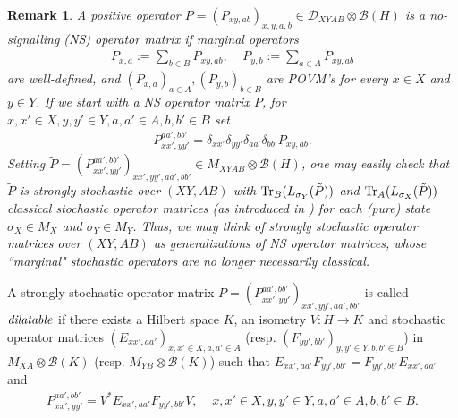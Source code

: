 \documentclass[11pt]{amsart}
\newtheorem{remark}[theorem]{Remark}
\newcommand{\cl}[1]{\mathcal{#1}}
\begin{document}
\begin{remark}\label{ns_generalization}
\rm A positive operator $P = (P_{xy, ab})_{x, y, a, b} \in \cl{D}_{XYAB}\otimes \cl{B}(H)$ is a \textit{no-signalling (NS) operator matrix} \cite{gt_one} if marginal operators
\begin{gather*}
	P_{x, a} := \sum\limits_{b \in B}P_{xy, ab}, \;\;\;\; P_{y, b} := \sum\limits_{a \in A}P_{xy, ab}
\end{gather*}
\noindent are well-defined, and $(P_{x, a})_{a \in A}, (P_{y, b})_{b \in B}$ are POVM's for every $x \in X$ and $y \in Y$. If we start with a NS operator matrix $P$, for $x, x' \in X, y, y' \in Y, a, a' \in A, b, b' \in B$ set
\begin{gather*}
	P_{xx', yy'}^{aa', bb'} = \delta_{xx'}\delta_{yy'}\delta_{aa'}\delta_{bb'}P_{xy, ab}.
\end{gather*}
\noindent Setting $\tilde{P} = (P_{xx', yy'}^{aa', bb'})_{xx', yy', aa', bb'} \in M_{XYAB}\otimes \cl{B}(H) $, one may easily check that $\tilde{P}$ is strongly stochastic over $(XY, AB)$ with ${\rm Tr}_{B}(L_{\sigma_{Y}}(\tilde{P}))$ and ${\rm Tr}_{A}(L_{\sigma_{X}}(\tilde{P}))$ \textit{classical stochastic operator matrices} (as introduced in \cite[Section 3]{tt}) for each (pure) state $\sigma_{X} \in M_{X}$ and $\sigma_{Y} \in M_{Y}$. Thus, we may think of strongly stochastic operator matrices over $(XY, AB)$ as generalizations of NS operator matrices, whose ``marginal" stochastic operators are no longer necessarily classical.
\end{remark}
A strongly stochastic operator matrix $P = (P_{xx', yy'}^{aa', bb'})_{xx', yy', aa', bb'}$ is called ${\it dilatable}$ if there exists a Hilbert space $K$, an isometry $V: H\rightarrow K$ and stochastic operator matrices $(E_{xx', aa'})_{x, x' \in X, a, a' \in A}$ (resp. $(F_{yy', bb'})_{y, y' \in Y, b, b' \in B}$) in $M_{XA}\otimes \cl{B}(K)$ (resp. $M_{YB}\otimes \cl{B}(K)$) such that $E_{xx', aa'}F_{yy', bb'} = F_{yy', bb'}E_{xx', aa'}$ and
\begin{gather}\label{dilate_eqn}
	P_{xx', yy'}^{aa', bb'} = V^{*}E_{xx', aa'}F_{yy', bb'}V, \;\;\;\; x, x' \in X, y, y' \in Y, a, a' \in A, b, b' \in B.
\end{gather} 
\end{document}
